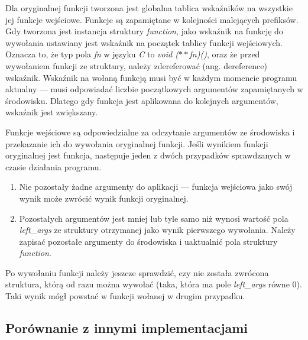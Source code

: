\documentclass[declaration,shortabstract]{iithesis}
\begin{document}
Dla oryginalnej funkcji tworzona jest globalna tablica wskaźników na wszystkie 
jej funkcje wejściowe. Funkcje są zapamiętane w kolejności malejących prefiksów.
Gdy tworzona jest instancja struktury \textit{function}, jako wskaźnik na 
funkcję do wywołania ustawiany jest wskaźnik na początek tablicy funkcji 
wejściowych. Oznacza to, że typ pola \textit{fn} w języku \textit{C} to 
\textit{void ($\ast\ast$fn)()}, oraz że przed wywołaniem funkcji ze struktury,
należy zdereferować (ang. dereference) wskaźnik. Wskaźnik na wołaną funkcją 
musi być w każdym momencie programu aktualny --- musi odpowiadać liczbie 
początkowych argumentów zapamiętanych w środowisku. Dlatego gdy 
funkcja jest aplikowana do kolejnych argumentów, wskaźnik jest zwiększany. 


Funkcje wejściowe są odpowiedzialne za odczytanie argumentów ze środowiska i 
przekazanie ich do wywołania oryginalnej funkcji. Jeśli wynikiem funkcji 
oryginalnej jest funkcja, następuje jeden z dwóch przypadków sprawdzanych w
czasie działania programu.

\begin{enumerate}
  \item Nie pozostały żadne argumenty do aplikacji ---
  funkcja wejściowa jako swój wynik może zwrócić wynik funkcji oryginalnej.
  \item Pozostałych argumentów jest mniej lub tyle samo niż wynosi 
  wartość pola \textit{left\_args} ze struktury otrzymanej jako wynik 
  pierwszego wywołania.
  Należy zapisać pozostałe argumenty do środowiska i uaktualnić pola struktury 
  \textit{function}.
\end{enumerate}

Po wywołaniu funkcji należy jeszcze sprawdzić, czy nie została zwrócona 
struktura, którą od razu można wywołać 
(taka, która ma pole \textit{left\_args} 
równe $0$). Taki wynik mógł powstać w funkcji wołanej w drugim przypadku.

\subsection{Porównanie z innymi implementacjami}
\end{document}
